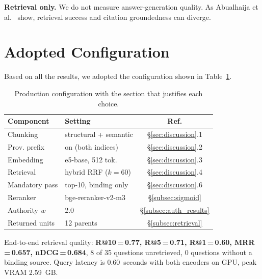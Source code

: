 \documentclass[11pt,a4paper,twocolumn]{article}
\begin{document}
\textbf{Retrieval only.} We do not measure answer-generation quality. As Abualhaija et al.~\cite{abualhaija2025} show, retrieval success and citation groundedness can diverge.

\section{Adopted Configuration}
\label{sec:config}

Based on all the results, we adopted the configuration shown in Table~\ref{tab:adopted}.

\begin{table}[t]
\centering
\caption{Production configuration with the section that justifies each choice.}
\label{tab:adopted}
\small
\begin{tabular}{@{}llc@{}}
\toprule
\textbf{Component} & \textbf{Setting} & \textbf{Ref.} \\
\midrule
Chunking        & structural + semantic    & §\ref{sec:discussion}.1 \\
Prov. prefix    & on (both indices)        & §\ref{sec:discussion}.2 \\
Embedding       & e5-base, 512 tok.        & §\ref{sec:discussion}.3 \\
Retrieval       & hybrid RRF ($k{=}60$)    & §\ref{sec:discussion}.4 \\
Mandatory pass  & top-10, binding only     & §\ref{sec:discussion}.6 \\
Reranker        & bge-reranker-v2-m3       & §\ref{subsec:sigmoid} \\
Authority $w$   & 2.0                      & §\ref{subsec:auth_results} \\
Returned units  & 12 parents               & §\ref{subsec:retrieval} \\
\bottomrule
\end{tabular}
\end{table}

End-to-end retrieval quality: \textbf{R@10\,=\,0.77, R@5\,=\,0.71, R@1\,=\,0.60, MRR\,=\,0.657, nDCG\,=\,0.684}, 8 of 35 questions unretrieved, 0 questions without a binding source. Query latency is 0.60~seconds with both encoders on GPU, peak VRAM 2.59~GB.


\end{document}
